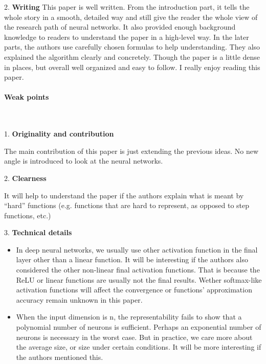 \documentclass{article}
\begin{document}
2. \textbf{Writing}  
This paper is well written. From the introduction part, it tells the whole story in a smooth, detailed way and still give the reader the whole view of the research path of neural networks. It also provided enough background knowledge to readers to understand the paper in a high-level way. In the later parts, the authors use carefully chosen formulas to help understanding. They also explained the algorithm clearly and concretely. Though the paper is a little dense in places, but overall well organized and easy to follow. 
I really enjoy reading this paper. 

\paragraph{Weak points}  \ 

1. \textbf{Originality and contribution}   

The main contribution of this paper is just extending the previous ideas. No new angle is introduced to look at the neural networks.

2. \textbf{Clearness} 

It will help to understand the paper if the authors explain what is meant by ``hard'' functions (e.g. functions that are hard to represent, as opposed to step functions, etc.) 

3. \textbf{Technical details} 

\begin{itemize}
\item In deep neural networks, we usually use other activation function in the final layer other than a linear function. It will be interesting if the authors also considered the other non-linear final activation functions. That is because the ReLU or linear functions are usually not the final results. Wether softmax-like activation functions will affect the convergence or functions' approximation accuracy remain unknown in this paper.
\item  When the input dimension is n, the representability fails to show that a polynomial number of neurons is sufficient. Perhaps an exponential number of neurons is necessary in the worst case. But in practice, we care more about the average size, or size under certain conditions. It will be more interesting if the authors mentioned this.
\end{itemize}

\newpage



\end{document}
